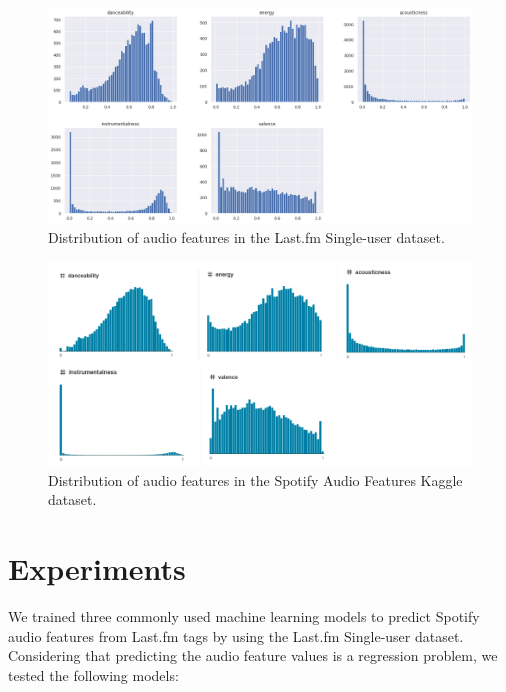 \documentclass[sn-mathphys]{sn-jnl}%
\theoremstyle{thmstyleone}%
\theoremstyle{thmstyletwo}%
\theoremstyle{thmstylethree}%
\begin{document}
\begin{figure}[h!]
      \centering
      \includegraphics[width=\textwidth]{images/features-distribution.png}
      \caption{Distribution of audio features in the Last.fm Single-user dataset.}
      \label{fig:audio-features-distribution}
\end{figure}

\begin{figure}[h!]
      \centering
      \includegraphics[width=\textwidth]{images/feature-distribution-kaggle.png}
      \caption{Distribution of audio features in the Spotify Audio Features Kaggle dataset.}
      \label{fig:audio-features-distribution-kaggle}
\end{figure}




\section{Experiments}

We trained three commonly used machine learning models to predict Spotify audio features from Last.fm tags by using the Last.fm Single-user dataset.
Considering that predicting the audio feature values is a regression problem, we tested the following models:
\end{document}
